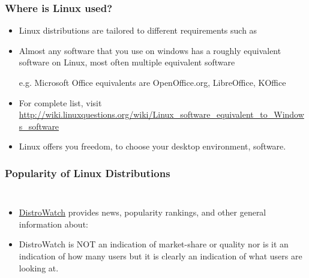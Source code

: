\documentclass[10pt,t]{beamer}
\begin{document}
\begin{frame}
  \frametitle{Where is Linux used?}
  \begin{itemize}
    \item Linux distributions are tailored to different requirements such as
    \item Almost any software that you use on windows has a roughly equivalent software on Linux, most often multiple equivalent software
    \item[e.g.] Microsoft Office equivalents are OpenOffice.org, LibreOffice, KOffice
    \item For complete list, visit \url{http://wiki.linuxquestions.org/wiki/Linux_software_equivalent_to_Windows_software}
    \item Linux offers you freedom, to choose your desktop environment, software.
  \end{itemize}
\end{frame}

\begin{frame}[fragile]
  \frametitle{Popularity of Linux Distributions}
  \begin{columns}[T]
    \begin{itemize}
      \item \href{http://distrowatch.com/}{\color{blue}DistroWatch} provides news, popularity rankings, and other general information about:
      \item DistroWatch is NOT an indication of market-share or quality nor is it an indication of how many users but  it is clearly an indication of what users are looking at.
    \end{itemize}
    
  \end{columns}
\end{frame}
\end{document}
